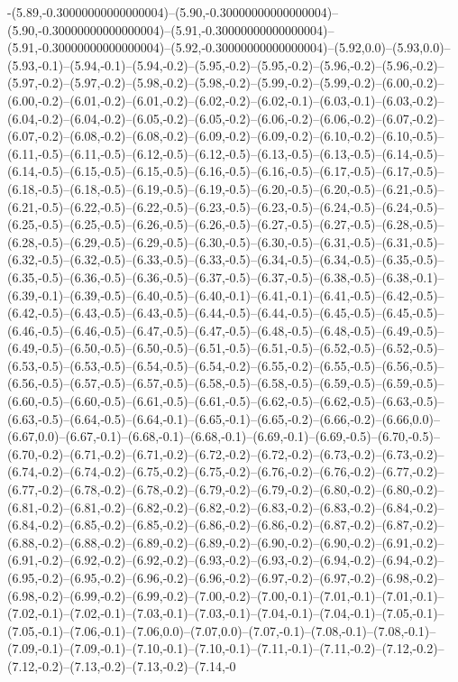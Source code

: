 -(5.89,-0.30000000000000004)--(5.90,-0.30000000000000004)--(5.90,-0.30000000000000004)--(5.91,-0.30000000000000004)--(5.91,-0.30000000000000004)--(5.92,-0.30000000000000004)--(5.92,0.0)--(5.93,0.0)--(5.93,-0.1)--(5.94,-0.1)--(5.94,-0.2)--(5.95,-0.2)--(5.95,-0.2)--(5.96,-0.2)--(5.96,-0.2)--(5.97,-0.2)--(5.97,-0.2)--(5.98,-0.2)--(5.98,-0.2)--(5.99,-0.2)--(5.99,-0.2)--(6.00,-0.2)--(6.00,-0.2)--(6.01,-0.2)--(6.01,-0.2)--(6.02,-0.2)--(6.02,-0.1)--(6.03,-0.1)--(6.03,-0.2)--(6.04,-0.2)--(6.04,-0.2)--(6.05,-0.2)--(6.05,-0.2)--(6.06,-0.2)--(6.06,-0.2)--(6.07,-0.2)--(6.07,-0.2)--(6.08,-0.2)--(6.08,-0.2)--(6.09,-0.2)--(6.09,-0.2)--(6.10,-0.2)--(6.10,-0.5)--(6.11,-0.5)--(6.11,-0.5)--(6.12,-0.5)--(6.12,-0.5)--(6.13,-0.5)--(6.13,-0.5)--(6.14,-0.5)--(6.14,-0.5)--(6.15,-0.5)--(6.15,-0.5)--(6.16,-0.5)--(6.16,-0.5)--(6.17,-0.5)--(6.17,-0.5)--(6.18,-0.5)--(6.18,-0.5)--(6.19,-0.5)--(6.19,-0.5)--(6.20,-0.5)--(6.20,-0.5)--(6.21,-0.5)--(6.21,-0.5)--(6.22,-0.5)--(6.22,-0.5)--(6.23,-0.5)--(6.23,-0.5)--(6.24,-0.5)--(6.24,-0.5)--(6.25,-0.5)--(6.25,-0.5)--(6.26,-0.5)--(6.26,-0.5)--(6.27,-0.5)--(6.27,-0.5)--(6.28,-0.5)--(6.28,-0.5)--(6.29,-0.5)--(6.29,-0.5)--(6.30,-0.5)--(6.30,-0.5)--(6.31,-0.5)--(6.31,-0.5)--(6.32,-0.5)--(6.32,-0.5)--(6.33,-0.5)--(6.33,-0.5)--(6.34,-0.5)--(6.34,-0.5)--(6.35,-0.5)--(6.35,-0.5)--(6.36,-0.5)--(6.36,-0.5)--(6.37,-0.5)--(6.37,-0.5)--(6.38,-0.5)--(6.38,-0.1)--(6.39,-0.1)--(6.39,-0.5)--(6.40,-0.5)--(6.40,-0.1)--(6.41,-0.1)--(6.41,-0.5)--(6.42,-0.5)--(6.42,-0.5)--(6.43,-0.5)--(6.43,-0.5)--(6.44,-0.5)--(6.44,-0.5)--(6.45,-0.5)--(6.45,-0.5)--(6.46,-0.5)--(6.46,-0.5)--(6.47,-0.5)--(6.47,-0.5)--(6.48,-0.5)--(6.48,-0.5)--(6.49,-0.5)--(6.49,-0.5)--(6.50,-0.5)--(6.50,-0.5)--(6.51,-0.5)--(6.51,-0.5)--(6.52,-0.5)--(6.52,-0.5)--(6.53,-0.5)--(6.53,-0.5)--(6.54,-0.5)--(6.54,-0.2)--(6.55,-0.2)--(6.55,-0.5)--(6.56,-0.5)--(6.56,-0.5)--(6.57,-0.5)--(6.57,-0.5)--(6.58,-0.5)--(6.58,-0.5)--(6.59,-0.5)--(6.59,-0.5)--(6.60,-0.5)--(6.60,-0.5)--(6.61,-0.5)--(6.61,-0.5)--(6.62,-0.5)--(6.62,-0.5)--(6.63,-0.5)--(6.63,-0.5)--(6.64,-0.5)--(6.64,-0.1)--(6.65,-0.1)--(6.65,-0.2)--(6.66,-0.2)--(6.66,0.0)--(6.67,0.0)--(6.67,-0.1)--(6.68,-0.1)--(6.68,-0.1)--(6.69,-0.1)--(6.69,-0.5)--(6.70,-0.5)--(6.70,-0.2)--(6.71,-0.2)--(6.71,-0.2)--(6.72,-0.2)--(6.72,-0.2)--(6.73,-0.2)--(6.73,-0.2)--(6.74,-0.2)--(6.74,-0.2)--(6.75,-0.2)--(6.75,-0.2)--(6.76,-0.2)--(6.76,-0.2)--(6.77,-0.2)--(6.77,-0.2)--(6.78,-0.2)--(6.78,-0.2)--(6.79,-0.2)--(6.79,-0.2)--(6.80,-0.2)--(6.80,-0.2)--(6.81,-0.2)--(6.81,-0.2)--(6.82,-0.2)--(6.82,-0.2)--(6.83,-0.2)--(6.83,-0.2)--(6.84,-0.2)--(6.84,-0.2)--(6.85,-0.2)--(6.85,-0.2)--(6.86,-0.2)--(6.86,-0.2)--(6.87,-0.2)--(6.87,-0.2)--(6.88,-0.2)--(6.88,-0.2)--(6.89,-0.2)--(6.89,-0.2)--(6.90,-0.2)--(6.90,-0.2)--(6.91,-0.2)--(6.91,-0.2)--(6.92,-0.2)--(6.92,-0.2)--(6.93,-0.2)--(6.93,-0.2)--(6.94,-0.2)--(6.94,-0.2)--(6.95,-0.2)--(6.95,-0.2)--(6.96,-0.2)--(6.96,-0.2)--(6.97,-0.2)--(6.97,-0.2)--(6.98,-0.2)--(6.98,-0.2)--(6.99,-0.2)--(6.99,-0.2)--(7.00,-0.2)--(7.00,-0.1)--(7.01,-0.1)--(7.01,-0.1)--(7.02,-0.1)--(7.02,-0.1)--(7.03,-0.1)--(7.03,-0.1)--(7.04,-0.1)--(7.04,-0.1)--(7.05,-0.1)--(7.05,-0.1)--(7.06,-0.1)--(7.06,0.0)--(7.07,0.0)--(7.07,-0.1)--(7.08,-0.1)--(7.08,-0.1)--(7.09,-0.1)--(7.09,-0.1)--(7.10,-0.1)--(7.10,-0.1)--(7.11,-0.1)--(7.11,-0.2)--(7.12,-0.2)--(7.12,-0.2)--(7.13,-0.2)--(7.13,-0.2)--(7.14,-0